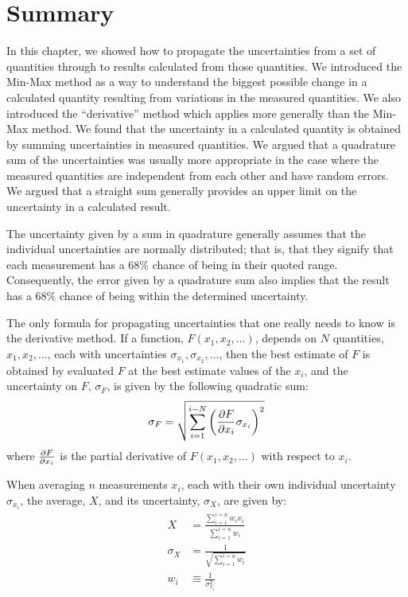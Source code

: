 \section{Summary}
In this chapter, we showed how to propagate the uncertainties from a set of quantities through to results calculated from those quantities. We introduced the Min-Max method as a way to understand the biggest possible change in a calculated quantity resulting from variations in the measured quantities. We also introduced the ``derivative'' method which applies more generally than the Min-Max method. We found that the uncertainty in a calculated quantity is obtained by summing uncertainties in measured quantities. We argued that a quadrature sum of the uncertainties was usually more appropriate in the case where the measured quantities are independent from each other and have random errors. We argued that a straight sum generally provides an upper limit on the uncertainty in a calculated result. 

The uncertainty given by a sum in quadrature generally assumes that the individual uncertainties are normally distributed; that is, that they signify that each measurement has a 68\% chance of being in their quoted range. Consequently, the error given by a quadrature sum also implies that the result has a 68\% chance of being within the determined uncertainty.

The only formula for propagating uncertainties that one really needs to know is the derivative method. If a function, $F(x_1, x_2, \dots)$, depends on $N$ quantities, $x_1, x_2, \dots$, each with uncertainties $\sigma_{x_1}, \sigma_{x_2}, \dots$, then the best estimate of $F$ is obtained by evaluated $F$ at the best estimate values of the $x_i$, and the uncertainty on $F$, $\sigma_{F}$, is given by the following quadratic sum:
\begin{align}
\sigma_{F} = \sqrt{\sum_{i=1}^{i-N}\left(\frac{\partial F}{\partial x_i}\sigma_{x_i}\right)^2}
\end{align}
where $\frac{\partial F}{\partial x_i}$ is the partial derivative of $F(x_1, x_2, \dots)$ with respect to $x_i$.

When averaging $n$ measurements $x_i$, each with their own individual uncertainty $\sigma_{x_i}$, the average, $X$, and its uncertainty, $\sigma_{X}$, are given by:
\begin{align*}
X &= \frac{\sum_{i=1}^{i=n}w_ix_i}{\sum_{i=1}^{i=n}w_i}\\
\sigma_{X} &= \frac{1}{\sqrt{\sum_{i=1}^{i=n}w_i}}\\
w_i&\equiv\frac{1}{\sigma_{x_i}^2}
\end{align*}

